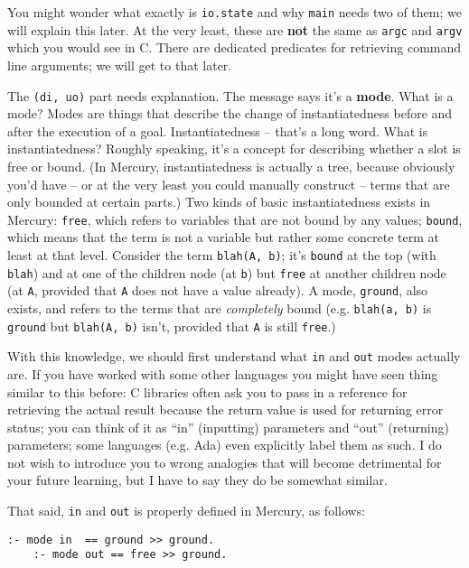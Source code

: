 You might wonder what exactly is \texttt{io.state} and why \texttt{main} needs two of them; we will explain this later. At the very least, these are \textbf{not} the same as \texttt{argc} and \texttt{argv} which you would see in C. There are dedicated predicates for retrieving command line arguments; we will get to that later.

The \texttt{(di, uo)} part needs explanation. The message says it's a \textbf{mode}. What is a mode? Modes are things that describe the change of instantiatedness before and after the execution of a goal. Instantiatedness -- that's a long word. What is instantiatedness? Roughly speaking, it's a concept for describing whether a slot is free or bound. (In Mercury, instantiatedness is actually a tree, because obviously you'd have -- or at the very least you could manually construct -- terms that are only bounded at certain parts.) Two kinds of basic instantiatedness exists in Mercury: \texttt{free}, which refers to variables that are not bound by any values; \texttt{bound}, which means that the term is not a variable but rather some concrete term at least at that level. Consider the term \texttt{blah(A, b)}; it's \texttt{bound} at the top (with \texttt{blah}) and at one of the children node (at \texttt{b}) but \texttt{free} at another children node (at \texttt{A}, provided that \texttt{A} does not have a value already). A mode, \texttt{ground}, also exists, and refers to the terms that are \emph{completely} bound (e.g. \texttt{blah(a, b)} is \texttt{ground} but \texttt{blah(A, b)} isn't, provided that \texttt{A} is still \texttt{free}.)

With this knowledge, we should first understand what \texttt{in} and \texttt{out} modes actually are. If you have worked with some other languages you might have seen thing similar to this before: C libraries often ask you to pass in a reference for retrieving the actual result because the return value is used for returning error status; you can think of it as ``in'' (inputting) parameters and ``out'' (returning) parameters; some languages (e.g. Ada) even explicitly label them as such. I do not wish to introduce you to wrong analogies that will become detrimental for your future learning, but I have to say they do be somewhat similar.

That said, \texttt{in} and \texttt{out} is properly defined in Mercury, as follows:

\begin{lstlisting}[language=Mercury]
	:- mode in  == ground >> ground.
	:- mode out == free >> ground.
\end{lstlisting}

